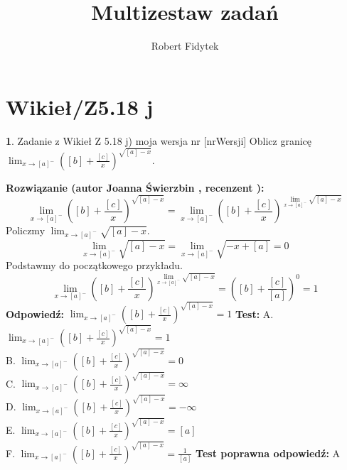 \documentclass[12pt, a4paper]{article}
\title{Multizestaw zadań}
\author{Robert Fidytek}
\date{}
\theoremstyle{definition} %
\newtheorem{zad}{}
\newcommand{\kategoria}[1]{\section{#1}} %
\newcommand{\zadStart}[1]{\begin{zad}#1\newline} %
\newcommand{\zadStop}{\end{zad}}   %
\newcommand{\rozwStart}[2]{\noindent \textbf{Rozwiązanie (autor #1 , recenzent #2): }\newline} %
\newcommand{\rozwStop}{\newline}                                            %
\newcommand{\odpStart}{\noindent \textbf{Odpowiedź:}\newline}    %
\newcommand{\odpStop}{\newline}                                             %
\newcommand{\testStart}{\noindent \textbf{Test:}\newline} %
\newcommand{\testStop}{\newline} %
\newcommand{\kluczStart}{\noindent \textbf{Test poprawna odpowiedź:}\newline} %
\newcommand{\kluczStop}{\newline} %
\begin{document}
\maketitle


\kategoria{Wikieł/Z5.18 j}
\zadStart{Zadanie z Wikieł Z 5.18 j) moja wersja nr [nrWersji]}
Oblicz granicę $\lim_{x \rightarrow [a]^-} \left( [b]+ \frac{[c]}{x} \right)^{\sqrt{[a]-x}}$.
\zadStop
\rozwStart{Joanna Świerzbin}{}
$$ \lim_{x \rightarrow [a]^-} \left( [b]+ \frac{[c]}{x} \right)^{\sqrt{[a]-x}} = \lim_{x \rightarrow [a]^-} \left( [b]+ \frac{[c]}{x} \right)^{\lim_{x \rightarrow [a]^-}\sqrt{[a]-x}}$$
Policzmy $ \lim_{x \rightarrow [a]^-}\sqrt{[a]-x}$.
$$ \lim_{x \rightarrow [a]^-}\sqrt{[a]-x} =  \lim_{x \rightarrow [a]^-}\sqrt{-x+[a]}=0$$
Podstawmy do początkowego przykładu.
$$ \lim_{x \rightarrow [a]^-} \left( [b]+ \frac{[c]}{x} \right)^{\lim_{x \rightarrow [a]^-}\sqrt{[a]-x}} = \left( [b]+ \frac{[c]}{[a]} \right)^{0} = 1 $$
\rozwStop
\odpStart
$\lim_{x \rightarrow [a]^-} \left( [b]+ \frac{[c]}{x} \right)^{\sqrt{[a]-x}} =1$
\odpStop
\testStart
A. $\lim_{x \rightarrow [a]^-} \left( [b]+ \frac{[c]}{x} \right)^{\sqrt{[a]-x}} =1$\\
B. $\lim_{x \rightarrow [a]^-} \left( [b]+ \frac{[c]}{x} \right)^{\sqrt{[a]-x}} =0$\\
C. $\lim_{x \rightarrow [a]^-} \left( [b]+ \frac{[c]}{x} \right)^{\sqrt{[a]-x}} =\infty$\\
D. $\lim_{x \rightarrow [a]^-} \left( [b]+ \frac{[c]}{x} \right)^{\sqrt{[a]-x}} =-\infty$\\
E. $\lim_{x \rightarrow [a]^-} \left( [b]+ \frac{[c]}{x} \right)^{\sqrt{[a]-x}} =[a]$\\
F. $\lim_{x \rightarrow [a]^-} \left( [b]+ \frac{[c]}{x} \right)^{\sqrt{[a]-x}} =\frac{1}{[a]}$
\testStop
\kluczStart
A
\kluczStop
\end{document}
